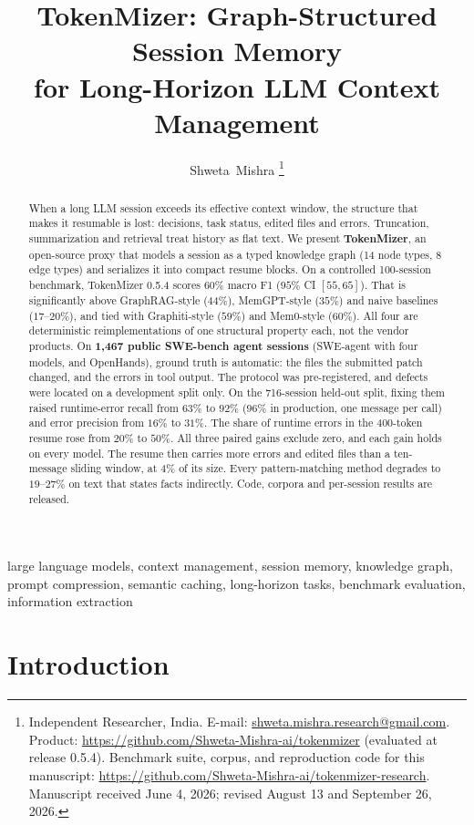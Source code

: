 \documentclass[journal]{IEEEtran}
\title{TokenMizer: Graph-Structured Session Memory\\
for Long-Horizon LLM Context Management}
\author{Shweta~Mishra%
\thanks{Independent Researcher, India.
E-mail: \href{mailto:shweta.mishra.research@gmail.com}{shweta.mishra.research@gmail.com}.
Product: \url{https://github.com/Shweta-Mishra-ai/tokenmizer} (evaluated
at release 0.5.4).
Benchmark suite, corpus, and reproduction code for this manuscript:
\url{https://github.com/Shweta-Mishra-ai/tokenmizer-research}.
Manuscript received June 4, 2026; revised August 13 and September 26, 2026.}%
}
\begin{document}
\maketitle

\begin{abstract}
When a long LLM session exceeds its effective context window, the
structure that makes it resumable is lost: decisions, task status,
edited files and errors. Truncation, summarization and retrieval
treat history as flat text. We present \textbf{TokenMizer}, an
open-source proxy that models a session as a typed knowledge graph
(14 node types, 8 edge types) and serializes it into compact resume
blocks.
On a controlled 100-session benchmark, TokenMizer 0.5.4 scores
$60\%$ macro F1 ($95\%$ CI $[55,65]$). That is significantly above
GraphRAG-style ($44\%$), MemGPT-style ($35\%$) and naive baselines
($17$--$20\%$), and tied with Graphiti-style ($59\%$) and Mem0-style
($60\%$). All four are deterministic reimplementations of one
structural property each, not the vendor products.
On \textbf{1{,}467 public SWE-bench agent sessions} (SWE-agent with
four models, and OpenHands), ground truth is
automatic: the files the submitted patch changed, and the errors in
tool output. The protocol was pre-registered, and defects were
located on a development split only. On the 716-session held-out
split, fixing them raised runtime-error recall from $63\%$ to $92\%$
($96\%$ in production, one message per call) and error precision
from $16\%$ to $31\%$. The share of runtime errors in the 400-token
resume rose from $20\%$ to $50\%$. All three paired gains exclude
zero, and each gain holds on every model. The resume then carries
more errors and edited files than a ten-message sliding window, at
$4\%$ of its size.
Every pattern-matching method degrades to $19$--$27\%$ on text that
states facts indirectly. Code, corpora and per-session results are
released.
\end{abstract}

\begin{IEEEkeywords}
large language models, context management, session memory,
knowledge graph, prompt compression, semantic caching,
long-horizon tasks, benchmark evaluation, information extraction
\end{IEEEkeywords}

\section{Introduction}
\label{sec:intro}
\end{document}
